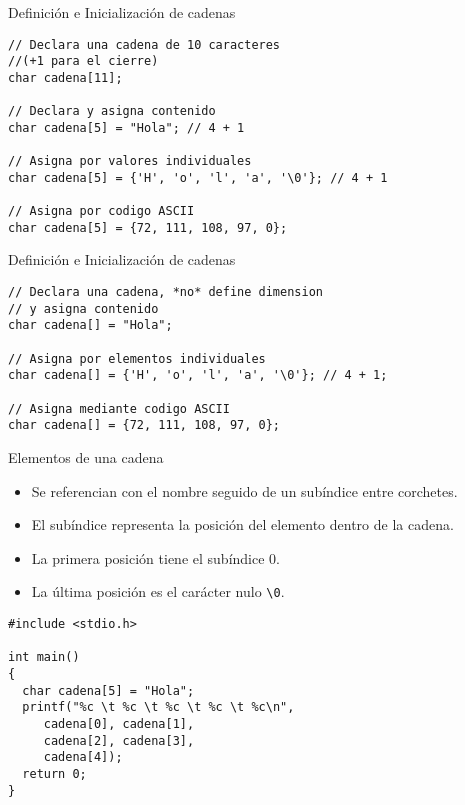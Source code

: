 \documentclass[xcolor={usenames,svgnames,dvipsnames}, aspectratio=169]{beamer}
\begin{document}
\begin{frame}[label={sec:org9afdddb},fragile]{Definición e Inicialización de cadenas}
 \lstset{language=C,label= ,caption= ,captionpos=b,numbers=none}
\begin{lstlisting}
// Declara una cadena de 10 caracteres 
//(+1 para el cierre)
char cadena[11];

// Declara y asigna contenido
char cadena[5] = "Hola"; // 4 + 1

// Asigna por valores individuales
char cadena[5] = {'H', 'o', 'l', 'a', '\0'}; // 4 + 1

// Asigna por codigo ASCII
char cadena[5] = {72, 111, 108, 97, 0}; 

\end{lstlisting}
\end{frame}

\begin{frame}[label={sec:org13e09d4},fragile]{Definición e Inicialización de cadenas}
 \lstset{language=C,label= ,caption= ,captionpos=b,numbers=none}
\begin{lstlisting}
// Declara una cadena, *no* define dimension 
// y asigna contenido 
char cadena[] = "Hola"; 

// Asigna por elementos individuales
char cadena[] = {'H', 'o', 'l', 'a', '\0'}; // 4 + 1; 

// Asigna mediante codigo ASCII
char cadena[] = {72, 111, 108, 97, 0}; 
\end{lstlisting}
\end{frame}

\begin{frame}[label={sec:org0883157},fragile]{Elementos de una cadena}
 \begin{itemize}
\item Se referencian con el nombre seguido de un subíndice entre corchetes.
\item El subíndice representa la posición del elemento dentro de la cadena.
\item La \alert{primera posición} tiene el \alert{subíndice 0}.
\item La \alert{última posición} es el carácter nulo \texttt{\textbackslash{}0}.
\end{itemize}

\lstset{language=C,label= ,caption= ,captionpos=b,numbers=none}
\begin{lstlisting}
#include <stdio.h>

int main()
{
  char cadena[5] = "Hola";
  printf("%c \t %c \t %c \t %c \t %c\n",
	 cadena[0], cadena[1],
	 cadena[2], cadena[3],
	 cadena[4]);
  return 0;
}
\end{lstlisting}
\end{frame}
\end{document}
